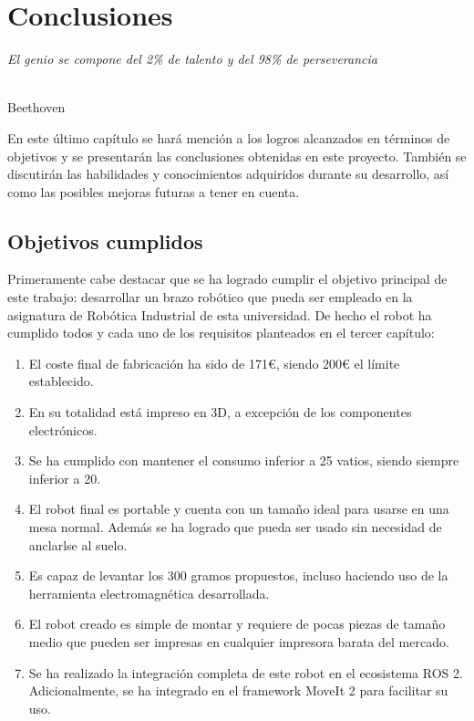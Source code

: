 \chapter{Conclusiones}
\label{cap:capitulo7}

\begin{flushright}
\begin{minipage}[]{10cm}
\emph{El genio se compone del 2\% de talento y del 98\% de perseverancia}\\
\end{minipage}\\

Beethoven\\
\end{flushright}

\vspace{1cm}

\noindent En este último capítulo se hará mención a los logros alcanzados en términos de objetivos y se presentarán 
las conclusiones obtenidas en este proyecto. También se discutirán las habilidades y conocimientos 
adquiridos durante su desarrollo, así como las posibles mejoras futuras a tener en cuenta.
\section{Objetivos cumplidos}
\noindent Primeramente cabe destacar que se ha logrado cumplir el objetivo principal de este trabajo: desarrollar un 
brazo robótico que pueda ser empleado en la asignatura de Robótica Industrial de esta universidad. De hecho el robot 
ha cumplido todos y cada uno de los requisitos planteados en el tercer capítulo:
\begin{enumerate}
\item El coste final de fabricación ha sido de 171\euro, siendo 200\euro \xspace el límite establecido.
\item En su totalidad está impreso en 3D, a excepción de los componentes electrónicos.
\item Se ha cumplido con mantener el consumo inferior a 25 vatios, siendo siempre inferior a 20.
\item El robot final es portable y cuenta con un tamaño ideal para usarse en una mesa normal. Además se ha logrado 
que pueda ser usado sin necesidad de anclarlse al suelo.
\item Es capaz de levantar los 300 gramos propuestos, incluso haciendo uso de la herramienta electromagnética desarrollada.
\item El robot creado es simple de montar y requiere de pocas piezas de tamaño medio que pueden ser impresas en cualquier 
impresora barata del mercado.
\item Se ha realizado la integración completa de este robot en el ecosistema ROS 2. Adicionalmente, se ha integrado en el 
framework MoveIt 2 para facilitar su uso.
\end{enumerate}

